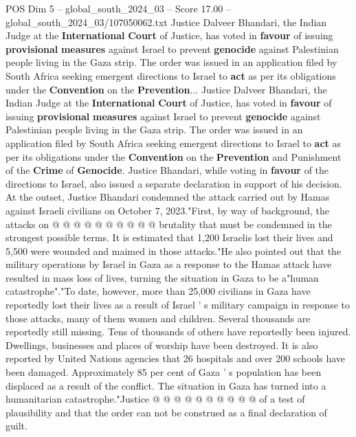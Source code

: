 \begin{textsample}{POS Dim 5 – global\_south\_2024\_03 – Score 17.00 – global\_south\_2024\_03/107050062.txt}  \label{ex:f5_pos_241}
Justice Dalveer Bhandari, the Indian Judge at the \textbf{International} \textbf{Court} of Justice, has voted in \textbf{favour} of issuing \textbf{provisional} \textbf{measures} against Israel to prevent \textbf{genocide} against Palestinian people living in the Gaza strip.
The order was issued in an application filed by South Africa seeking emergent directions to Israel to \textbf{act} as per its obligations under the \textbf{Convention} on the \textbf{Prevention}...
Justice Dalveer Bhandari, the Indian Judge at the \textbf{International} \textbf{Court} of Justice, has voted in \textbf{favour} of issuing \textbf{provisional} \textbf{measures} against Israel to prevent \textbf{genocide} against Palestinian people living in the Gaza strip.
The order was issued in an application filed by South Africa seeking emergent directions to Israel to \textbf{act} as per its obligations under the \textbf{Convention} on the \textbf{Prevention} and Punishment of the \textbf{Crime} of \textbf{Genocide}.
Justice Bhandari, while voting in \textbf{favour} of the directions to Israel, also issued a separate declaration in support of his decision.
At the outset, Justice Bhandari condemned the attack carried out by Hamas against Israeli civilians on October 7, 2023."First, by way of background, the attacks on @ @ @ @ @ @ @ @ @ @ brutality that must be condemned in the strongest possible terms.
It is estimated that 1,200 Israelis lost their lives and 5,500 were wounded and maimed in those attacks."He also pointed out that the military operations by Israel in Gaza as a response to the Hamas attack have resulted in mass loss of lives, turning the situation in Gaza to be a"human catastrophe"."To date, however, more than 25,000 civilians in Gaza have reportedly lost their lives as a result of Israel ' s military campaign in response to those attacks, many of them women and children.
Several thousands are reportedly still missing.
Tens of thousands of others have reportedly been injured.
Dwellings, businesses and places of worship have been destroyed.
It is also reported by United Nations agencies that 26 hospitals and over 200 schools have been damaged.
Approximately 85 per cent of Gaza ' s population has been displaced as a result of the conflict.
The situation in Gaza has turned into a humanitarian catastrophe."Justice @ @ @ @ @ @ @ @ @ @ of a test of plausibility and that the order can not be construed as a final declaration of guilt.

\end{textsample}
